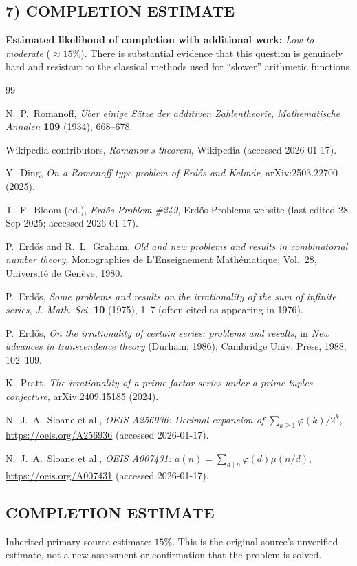 \subsection*{7) COMPLETION ESTIMATE}
\textbf{Estimated likelihood of completion with additional work:} \emph{Low-to-moderate} (\(\approx 15\%\)). There is substantial evidence that this question is genuinely hard and resistant to the classical methods used for ``slower'' arithmetic functions.


\begin{thebibliography}{99}

N.~P.~Romanoff,
\newblock \emph{\"Uber einige S\"atze der additiven Zahlentheorie},
\newblock \emph{Mathematische Annalen} \textbf{109} (1934), 668--678.

Wikipedia contributors,
\newblock \emph{Romanov's theorem}, Wikipedia (accessed 2026-01-17).

Y.~Ding,
\newblock \emph{On a Romanoff type problem of Erd\H{o}s and Kalm\'ar},
\newblock arXiv:2503.22700 (2025).

T.~F.~Bloom (ed.),
\newblock \emph{Erd\H{o}s Problem \#249}, Erd\H{o}s Problems website (last edited 28 Sep 2025; accessed 2026-01-17).

P.~Erd\H{o}s and R.~L.~Graham,
\newblock \emph{Old and new problems and results in combinatorial number theory},
\newblock Monographies de L'Enseignement Math\'ematique, Vol.~28, Universit\'e de Gen\`eve, 1980.

P.~Erd\H{o}s,
\newblock \emph{Some problems and results on the irrationality of the sum of infinite series},
\newblock \emph{J. Math. Sci.} \textbf{10} (1975), 1--7 (often cited as appearing in 1976).

P.~Erd\H{o}s,
\newblock \emph{On the irrationality of certain series: problems and results},
\newblock in \emph{New advances in transcendence theory} (Durham, 1986),
\newblock Cambridge Univ. Press, 1988, 102--109.

K.~Pratt,
\newblock \emph{The irrationality of a prime factor series under a prime tuples conjecture},
\newblock arXiv:2409.15185 (2024).

N.~J.~A.~Sloane et al.,
\newblock \emph{OEIS A256936: Decimal expansion of $\sum_{k\ge 1}\varphi(k)/2^k$},
\newblock \url{https://oeis.org/A256936} (accessed 2026-01-17).

N.~J.~A.~Sloane et al.,
\newblock \emph{OEIS A007431: $a(n)=\sum_{d\mid n}\varphi(d)\mu(n/d)$},
\newblock \url{https://oeis.org/A007431} (accessed 2026-01-17).

\end{thebibliography}



\subsection*{COMPLETION ESTIMATE}
Inherited primary-source estimate: $15\%$. This is the original source's unverified estimate, not a new assessment or confirmation that the problem is solved.

